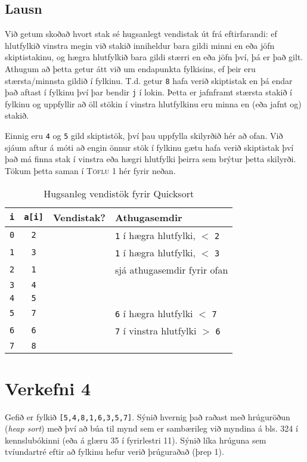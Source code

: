 \documentclass[12pt, a4paper, hidelinks]{article}
\newcommand{\cmark}{\text{\color{Green}\ding{51}}}
\newcommand{\xmark}{\text{\color{Red}\ding{55}}}
\begin{document}
\subsection*{Lausn}
Við getum skoðað hvort stak sé hugsanlegt vendistak út frá eftirfarandi: ef hlutfylkið vinstra megin við stakið inniheldur bara gildi minni en eða jöfn skiptistakinu,
og hægra hlutfylkið bara gildi stærri en eða jöfn því, þá er það gilt. Athugum að þetta getur átt við um endapunkta fylkisins, ef þeir eru stærsta/minnsta gildið í fylkinu.
T.d. getur \texttt{8} hafa verið skiptistak en þá endar það aftast í fylkinu því þar bendir \texttt{j} í lokin. Þetta er jafnframt stærsta stakið í fylkinu og uppfyllir að
öll stökin í vinstra hlutfylkinu eru minna en (eða jafnt og) stakið.

Einnig eru \texttt{4} og \texttt{5} gild skiptistök, því þau uppfylla skilyrðið hér að ofan. Við sjáum aftur á móti að engin önnur stök í fylkinu gætu hafa verið skiptistak því
það má finna stak í vinstra eða hægri hlutfylki þeirra sem brýtur þetta skilyrði. Tökum þetta saman í \textsc{Töflu} 1 hér fyrir neðan.

\begin{table}[H]
\centering
\begin{tabular}{cccl}
\toprule
  \texttt{i} & \texttt{a[i]} & Vendistak? & Athugasemdir \\
  \midrule
  \texttt{0} & \texttt{2} & \xmark & \texttt{1} í hægra hlutfylki, $<$ \texttt{2} \\
  \texttt{1} & \texttt{3} & \xmark & \texttt{1} í hægra hlutfylki, $<$ \texttt{3} \\
  \texttt{2} & \texttt{1} & \xmark & sjá athugasemdir fyrir ofan \\
  \texttt{3} & \texttt{4} & \cmark & \\
  \texttt{4} & \texttt{5} & \cmark & \\
  \texttt{5} & \texttt{7} & \xmark & \texttt{6} í hægra hlutfylki $<$ \texttt{7} \\
  \texttt{6} & \texttt{6} & \xmark & \texttt{7} í vinstra hlutfylki $>$ \texttt{6} \\
  \texttt{7} & \texttt{8} & \cmark & \\
\bottomrule
\end{tabular}
\caption{Hugsanleg vendistök fyrir Quicksort}
\end{table}

\newpage

\section*{Verkefni 4}
Gefið er fylkið \texttt{[5,4,8,1,6,3,5,7]}. Sýnið hvernig það raðast með hrúguröðun (\emph{heap sort}) með því að búa til mynd
sem er sambærileg við myndina á bls. 324 í kennslubókinni (eða á glæru 35 í fyrirlestri 11). Sýnið líka hrúguna sem tvíundartré eftir að
fylkinu hefur verið þrúguraðað (þrep 1).
\end{document}
